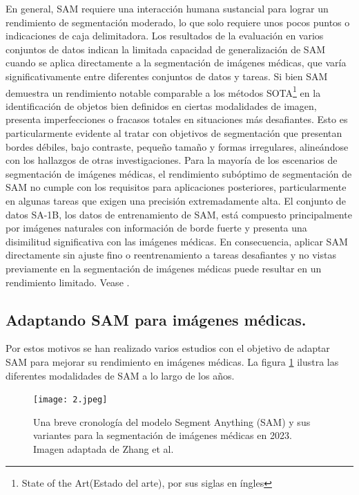 \documentclass[12pt]{article}
\begin{document}
		En general, SAM requiere una interacción humana sustancial para lograr un rendimiento de segmentación moderado, lo que solo requiere unos pocos puntos o indicaciones de caja delimitadora. Los resultados de la evaluación en varios conjuntos de datos indican la limitada capacidad de generalización de SAM cuando se aplica directamente a la segmentación de imágenes médicas, que varía significativamente entre diferentes conjuntos de datos y tareas. Si bien SAM demuestra un rendimiento notable comparable a los métodos SOTA\footnote{State of the Art(Estado del arte), por sus siglas en \'ingles} en la identificación de objetos bien definidos en ciertas modalidades de imagen, presenta imperfecciones o fracasos totales en situaciones más desafiantes. Esto es particularmente evidente al tratar con objetivos de segmentación que presentan bordes débiles, bajo contraste, pequeño tamaño y formas irregulares, alineándose con los hallazgos de otras investigaciones. Para la mayoría de los escenarios de segmentación de imágenes médicas, el rendimiento subóptimo de segmentación de SAM no cumple con los requisitos para aplicaciones posteriores, particularmente en algunas tareas que exigen una precisión extremadamente alta. El conjunto de datos SA-1B, los datos de entrenamiento de SAM, está compuesto principalmente por imágenes naturales con información de borde fuerte y presenta una disimilitud significativa con las imágenes médicas. En consecuencia, aplicar SAM directamente sin ajuste fino o reentrenamiento a tareas desafiantes y no vistas previamente en la segmentación de imágenes médicas puede resultar en un rendimiento limitado. Vease \cite{Zhang2024SegmentAnything}.
		
		\subsection{Adaptando SAM para im\'agenes m\'edicas.}
		
		Por estos motivos se han realizado varios estudios con el objetivo de adaptar SAM para mejorar su rendimiento en im\'agenes m\'edicas. La figura \ref{fig:fig3} ilustra las diferentes modalidades de SAM a lo largo de los a\~nos.
		\\
			\begin{figure}[h] 
				\centering
				\caption{Una breve cronología del modelo Segment Anything (SAM) \cite{kirillov2023segment} y sus variantes para la segmentación de imágenes médicas en 2023. Imagen adaptada de Zhang et al. \cite{Zhang2024SegmentAnything}}
				\texttt{[image: 2.jpeg]}
				
				\label{fig:fig3}
				
				
			\end{figure}
		
\end{document}
